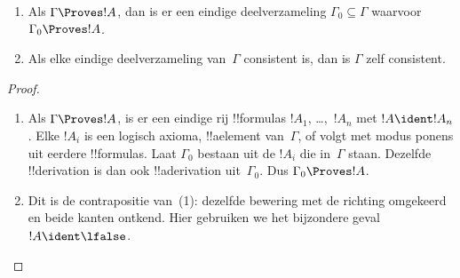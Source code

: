 \documentclass[../../../include/open-logic-section]{subfiles}
\begin{document}
\begin{prop}
  \begin{enumerate}
  \item Als $\Gamma \Proves !A$, dan is er een eindige
    deelverzameling $\Gamma_0 \subseteq \Gamma$ waarvoor
    $\Gamma_0 \Proves !A$.
  \item Als elke eindige deelverzameling van~$\Gamma$ consistent is,
    dan is $\Gamma$ zelf consistent.
  \end{enumerate}
\end{prop}

\begin{proof}
  \begin{enumerate}
    \item Als $\Gamma \Proves !A$, is er een eindige rij
      !!{formula}s $!A_1$, \dots,~$!A_n$ met $!A \ident !A_n$. Elke
      $!A_i$ is een logisch axioma, !!a{element} van~$\Gamma$, of volgt
      met modus ponens uit eerdere !!{formula}s. Laat $\Gamma_0$
      bestaan uit de $!A_i$ die in~$\Gamma$ staan. Dezelfde
      !!{derivation} is dan ook !!a{derivation} uit~$\Gamma_0$. Dus
      $\Gamma_0 \Proves !A$.
    \item Dit is de contrapositie van~(1): dezelfde bewering met de
      richting omgekeerd en beide kanten ontkend. Hier gebruiken we
      het bijzondere geval $!A \ident \lfalse$.
\end{enumerate}
\end{proof}
\end{document}
